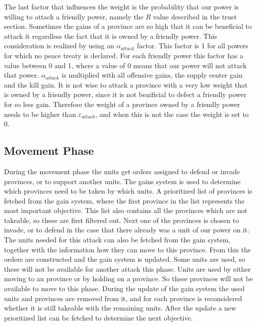 \documentclass[a4paper]{article} %
\begin{document}
The last factor that influences the weight is the probability that our power is willing to attack a friendly power, namely the $R$ value described in the trust section. Sometimes the gains of a province are so high that it can be beneficial to attack it regardless the fact that it is owned by a friendly power. This consideration is realized by using an $\alpha_{attack}$ factor. This factor is 1 for all powers for which no peace treaty is declared. For each friendly power this factor has a value between 0 and 1, where a value of 0 means that our power will not attack that power. $\alpha_{attack}$ is multiplied with all offensive gains, the supply center gain and the kill gain. It is not wise to attack a province with a very low weight that is owned by a friendly power, since it is not benificial to defect a friendly power for so less gain. Therefore the weight of a province owned by a friendly power needs to be higher than $\varepsilon_{attack}$, and when this is not the case the weight is set to 0. 

\subsection{Movement Phase} 

During the movement phase the units get orders assigned to defend or invade provinces, or to support another units. The gains system is used to determine which provinces need to be taken by which units. A prioritized list of provinces is fetched from the gain system, where the first province in the list represents the most important objective. This list also contains all the provinces which are not takeable, so these are first filtered out. Next one of the provinces is chosen to invade, or to defend in the case that there already was a unit of our power on it. The units needed for this attack can also be fetched from the gain system, together with the information how they can move to this province. From this the orders are constructed and the gain system is updated. Some units are used, so these will not be available for another attack this phase. Units are used by either moving to an province or by holding on a province. So these provinces will not be available to move to this phase. During the update of the gain system the used units and provinces are removed from it, and for each province is reconsidered whether it is still takeable with the remaining units. After the update a new prioritized list can be fetched to determine the next objective. 
\end{document}
